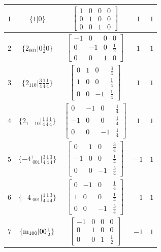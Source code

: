 \documentclass[fleqn,8pt]{jsarticle}
\begin{document}
\begin{longtable}{ccccc}
$ 1 $ & $ \{1|0\} $ & $ \begin{bmatrix} 1 & 0 & 0 & 0 \\ 0 & 1 & 0 & 0 \\ 0 & 0 & 1 & 0 \end{bmatrix} $ & $ 1 $ & $ 1 $ \\ \hline
$ 2 $ & $ \{2{}_{001}|0 \frac{1}{2} 0\} $ & $ \begin{bmatrix} -1 & 0 & 0 & 0 \\ 0 & -1 & 0 & \frac{1}{2} \\ 0 & 0 & 1 & 0 \end{bmatrix} $ & $ 1 $ & $ 1 $ \\ \hline
$ 3 $ & $ \{2{}_{110}|\frac{3}{4} \frac{1}{4} \frac{1}{4}\} $ & $ \begin{bmatrix} 0 & 1 & 0 & \frac{3}{4} \\ 1 & 0 & 0 & \frac{1}{4} \\ 0 & 0 & -1 & \frac{1}{4} \end{bmatrix} $ & $ 1 $ & $ 1 $ \\ \hline
$ 4 $ & $ \{2{}_{1-10}|\frac{1}{4} \frac{1}{4} \frac{1}{4}\} $ & $ \begin{bmatrix} 0 & -1 & 0 & \frac{1}{4} \\ -1 & 0 & 0 & \frac{1}{4} \\ 0 & 0 & -1 & \frac{1}{4} \end{bmatrix} $ & $ 1 $ & $ 1 $ \\ \hline
$ 5 $ & $ \{-4^{+}_{\,\,001}|\frac{3}{4} \frac{1}{4} \frac{3}{4}\} $ & $ \begin{bmatrix} 0 & 1 & 0 & \frac{3}{4} \\ -1 & 0 & 0 & \frac{1}{4} \\ 0 & 0 & -1 & \frac{3}{4} \end{bmatrix} $ & $ -1 $ & $ 1 $ \\ \hline
$ 6 $ & $ \{-4^{-}_{\,\,001}|\frac{1}{4} \frac{1}{4} \frac{3}{4}\} $ & $ \begin{bmatrix} 0 & -1 & 0 & \frac{1}{4} \\ 1 & 0 & 0 & \frac{1}{4} \\ 0 & 0 & -1 & \frac{3}{4} \end{bmatrix} $ & $ -1 $ & $ 1 $ \\ \hline
$ 7 $ & $ \{{\rm m}_{100}|0 0 \frac{1}{2}\} $ & $ \begin{bmatrix} -1 & 0 & 0 & 0 \\ 0 & 1 & 0 & 0 \\ 0 & 0 & 1 & \frac{1}{2} \end{bmatrix} $ & $ -1 $ & $ 1 $ \\ \hline

\end{longtable}
\end{document}
